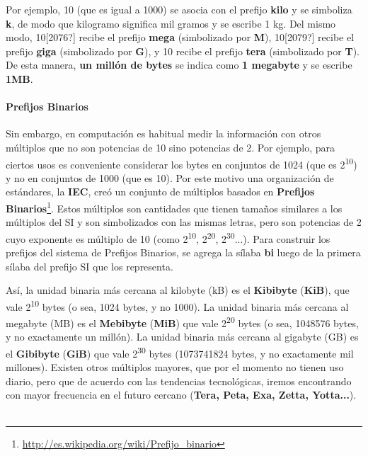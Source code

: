 \documentclass[a4paper]{article}
\begin{document}
Por ejemplo, 10{\textthreesuperior} (que es igual a 1000) se asocia con
el prefijo \textbf{kilo} y se simboliza \textbf{k}, de modo que
kilogramo significa mil gramos y se escribe 1 kg. Del mismo modo,
10[2076?] recibe el prefijo \textbf{mega} (simbolizado por \textbf{M}),
10[2079?] recibe el prefijo \textbf{giga} (simbolizado por \textbf{G}),
y 10{\textonesuperior}{\texttwosuperior} recibe el prefijo
\textbf{tera} (simbolizado por \textbf{T}). De esta manera, \textbf{un
mill\'on de bytes }se indica como \textbf{1 megabyte} y se escribe
\textbf{1MB}.

\paragraph{Prefijos Binarios}
Sin embargo, en computaci\'on es habitual medir la informaci\'on con
otros m\'ultiplos que no son potencias de 10 sino potencias de 2. Por
ejemplo, para ciertos usos es conveniente considerar los bytes en
conjuntos de 1024 (que es 2\textsuperscript{10}) y no en conjuntos de
1000 (que es 10{\textthreesuperior}). Por este motivo una
organizaci\'on de est\'andares, la \textbf{IEC}, cre\'o un conjunto de
m\'ultiplos basados en \textbf{Prefijos
Binarios}\footnote{\url{http://es.wikipedia.org/wiki/Prefijo_binario}}.
Estos m\'ultiplos son cantidades que tienen tama\~nos similares a los
m\'ultiplos del SI y son simbolizados con las mismas letras, pero son
potencias de 2 cuyo exponente es m\'ultiplo de 10 (como
2\textsuperscript{10}, 2\textsuperscript{20},
2\textsuperscript{30}...). Para construir los prefijos del sistema de
Prefijos Binarios, se agrega la s\'ilaba \textbf{bi} luego de la
primera s\'ilaba del prefijo SI que los representa.

As\'i, la unidad binaria m\'as cercana al kilobyte (kB) es el
\textbf{Kibibyte} (\textbf{KiB}), que vale 2\textsuperscript{10} bytes
(o sea, 1024 bytes, y no 1000). La unidad binaria m\'as cercana al
megabyte (MB) es el \textbf{Mebibyte} (\textbf{MiB}) que vale
2\textsuperscript{20} bytes (o sea, 1048576 bytes, y no exactamente un
mill\'on). La unidad binaria m\'as cercana al gigabyte (GB) es el
\textbf{Gibibyte} (\textbf{GiB}) que vale 2\textsuperscript{30} bytes
(1073741824 bytes, y no exactamente mil millones). Existen otros
m\'ultiplos mayores, que por el momento no tienen uso diario, pero que
de acuerdo con las tendencias tecnol\'ogicas, iremos encontrando con
mayor frecuencia en el futuro cercano (\textbf{Tera, Peta, Exa, Zetta,
Yotta...}). \ 
\end{document}
